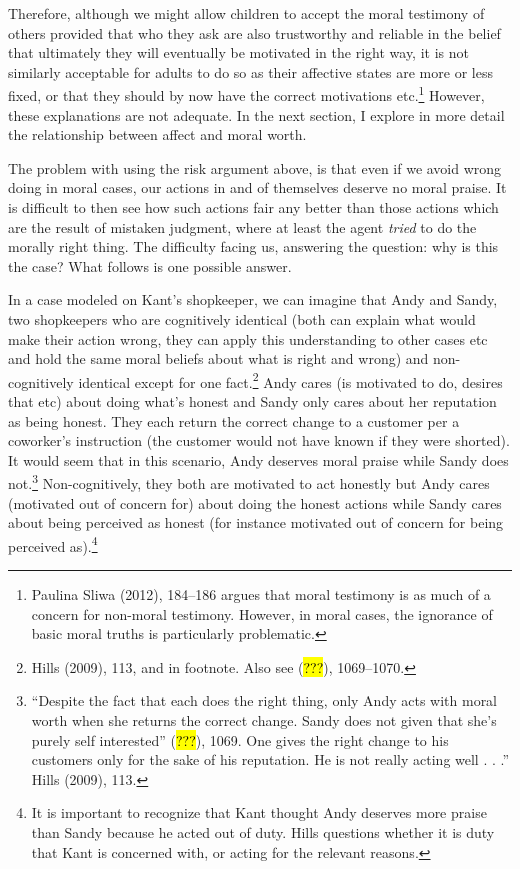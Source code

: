\documentclass[
  letterpaper,
  DIV=11,
  numbers=noendperiod]{scrartcl}
\theoremstyle{remark}
\begin{document}
Therefore, although we might allow children to accept the moral
testimony of others provided that who they ask are also trustworthy and
reliable in the belief that ultimately they will eventually be motivated
in the right way, it is not similarly acceptable for adults to do so as
their affective states are more or less fixed, or that they should by
now have the correct motivations etc.\footnote{Paulina Sliwa (2012),
  184--186 argues that moral testimony is as much of a concern for
  non-moral testimony. However, in moral cases, the ignorance of basic
  moral truths is particularly problematic.} However, these explanations
are not adequate. In the next section, I explore in more detail the
relationship between affect and moral worth.

The problem with using the risk argument above, is that even if we avoid
wrong doing in moral cases, our actions in and of themselves deserve no
moral praise. It is difficult to then see how such actions fair any
better than those actions which are the result of mistaken judgment,
where at least the agent \emph{tried} to do the morally right thing. The
difficulty facing us, answering the question: why is this the case? What
follows is one possible answer.

In a case modeled on Kant's shopkeeper, we can imagine that Andy and
Sandy, two shopkeepers who are cognitively identical (both can explain
what would make their action wrong, they can apply this understanding to
other cases etc and hold the same moral beliefs about what is right and
wrong) and non-cognitively identical except for one fact.\footnote{Hills
  (2009), 113, and in footnote. Also see (\hl{???}), 1069--1070.} Andy
cares (is motivated to do, desires that etc) about doing what's honest
and Sandy only cares about her reputation as being honest. They each
return the correct change to a customer per a coworker's instruction
(the customer would not have known if they were shorted). It would seem
that in this scenario, Andy deserves moral praise while Sandy does
not.\footnote{``Despite the fact that each does the right thing, only
  Andy acts with moral worth when she returns the correct change. Sandy
  does not given that she's purely self interested'' (\hl{???}), 1069.
  One gives the right change to his customers only for the sake of his
  reputation. He is not really acting well . . .'' Hills (2009), 113.}
Non-cognitively, they both are motivated to act honestly but Andy cares
(motivated out of concern for) about doing the honest actions while
Sandy cares about being perceived as honest (for instance motivated out
of concern for being perceived as).\footnote{It is important to
  recognize that Kant thought Andy deserves more praise than Sandy
  because he acted out of duty. Hills questions whether it is duty that
  Kant is concerned with, or acting for the relevant reasons.}
\end{document}
